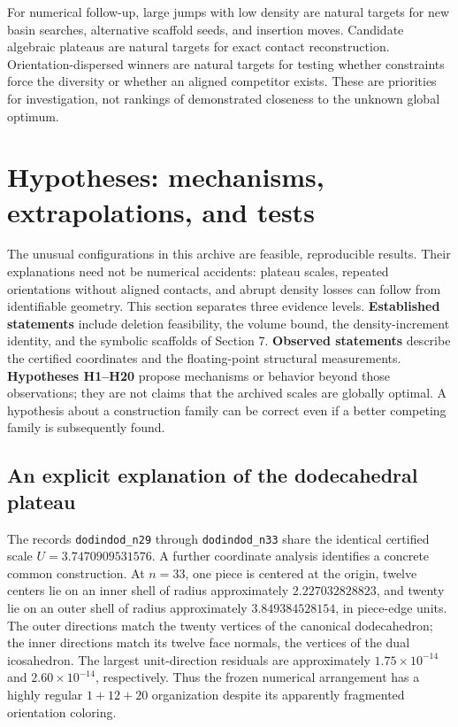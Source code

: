\documentclass[11pt,a4paper]{article}
\begin{document}
For numerical follow-up, large jumps with low density are natural targets for new basin searches, alternative scaffold seeds, and insertion moves. Candidate algebraic plateaus are natural targets for exact contact reconstruction. Orientation-dispersed winners are natural targets for testing whether constraints force the diversity or whether an aligned competitor exists. These are priorities for investigation, not rankings of demonstrated closeness to the unknown global optimum.

\section{Hypotheses: mechanisms, extrapolations, and tests}

The unusual configurations in this archive are feasible, reproducible results. Their explanations need not be numerical accidents: plateau scales, repeated orientations without aligned contacts, and abrupt density losses can follow from identifiable geometry. This section separates three evidence levels. \textbf{Established statements} include deletion feasibility, the volume bound, the density-increment identity, and the symbolic scaffolds of Section 7. \textbf{Observed statements} describe the certified coordinates and the floating-point structural measurements. \textbf{Hypotheses H1--H20} propose mechanisms or behavior beyond those observations; they are not claims that the archived scales are globally optimal. A hypothesis about a construction family can be correct even if a better competing family is subsequently found.

\subsection{An explicit explanation of the dodecahedral plateau}

The records \nolinkurl{dodindod_n29} through \nolinkurl{dodindod_n33} share the identical certified scale $U=3.7470909531576$. A further coordinate analysis identifies a concrete common construction. At $n=33$, one piece is centered at the origin, twelve centers lie on an inner shell of radius approximately $2.227032828823$, and twenty lie on an outer shell of radius approximately $3.849384528154$, in piece-edge units. The outer directions match the twenty vertices of the canonical dodecahedron; the inner directions match its twelve face normals, the vertices of the dual icosahedron. The largest unit-direction residuals are approximately $1.75\times10^{-14}$ and $2.60\times10^{-14}$, respectively. Thus the frozen numerical arrangement has a highly regular $1+12+20$ organization despite its apparently fragmented orientation coloring.
\end{document}
